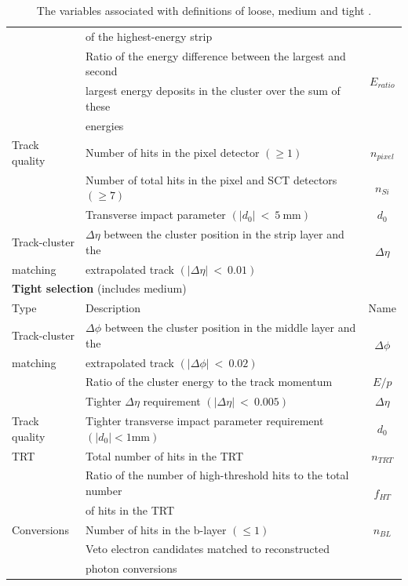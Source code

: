 \begin {table}[h!]
\begin{center}
\begin{tabular}{llc}
							& of the highest-energy strip 				&           \\
							\rule{0pt}{3ex}
							& Ratio of the energy difference between the largest and second  		& \multirow{2}{*}{$E_{ratio}$}			\\
							& largest  energy deposits in the cluster over the sum of these 					&						\\
							& energies & \\
\rule{0pt}{4ex}Track quality	& Number of hits in the pixel detector $(\geq1)$							& $n_{pixel}$			\\
							& Number of total hits in the pixel and SCT detectors $(\geq7)$					& $n_{Si}$				\\
							& Transverse impact parameter $(|d_{0}|~<~5~\text{mm})$							& $d_{0}$				\\
\rule{0pt}{4ex}Track-cluster		& $\Delta\eta$ between the cluster position in the strip layer and the  	& \multirow{2}{*}{$\Delta\eta$} 	\\
		matching			& extrapolated track $(|\Delta\eta|~<~0.01)$													& 						\\
		\hline				
		\hline
		\multicolumn{3}{l}{{\bf Tight selection} (includes medium)}																	\\
		Type 				& Description 																	& Name 					\\
		\hline
\rule{0pt}{3ex}Track-cluster		& $\Delta\phi$ between the cluster position in the middle layer and the  & \multirow{2}{*}{$\Delta\phi$}	\\
		matching			& extrapolated track $(|\Delta\phi|~<~0.02)$													& 						\\
							& Ratio of the cluster energy to the track momentum								& $E/p$					\\
							& Tighter $\Delta\eta$ requirement $(|\Delta\eta|~<~0.005)$						& $\Delta\eta$ 			\\
\rule{0pt}{4ex}Track quality		& Tighter transverse impact parameter requirement $(|d_{0}|<1\text{mm})$		& $d_{0}$				\\
		TRT 				& Total number of hits in the TRT 												& $n_{TRT}$				\\
							& Ratio of the number of high-threshold hits to the total number  				& \multirow{2}{*}{$f_{HT}$}				\\
							& of hits in the TRT 																		& 						\\
\rule{0pt}{4ex}Conversions 	& Number of hits in the b-layer $(\leq1)$ 										& $n_{BL}$				\\
							& Veto electron candidates matched to reconstructed  & 						\\
							& photon conversions 		 						 & 						\\
		\hline
  		\end{tabular}
  	\caption{The variables associated with definitions of loose, medium and tight \cite{Aad:2011mk}.}
  	\label{tab:Rec_lmt}
  	\end{center}
	\end {table}












